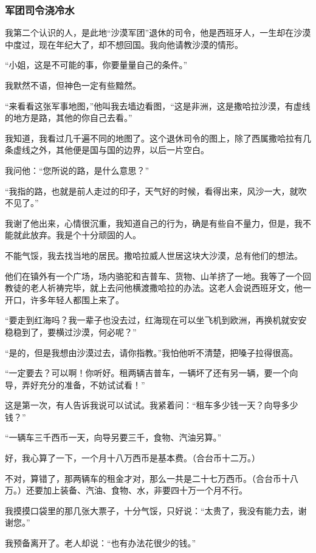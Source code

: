 \subsubsection*{军团司令浇冷水}
\par 我第二个认识的人，是此地“沙漠军团”退休的司令，他是西班牙人，一生却在沙漠中度过，现在年纪大了，却不想回国。我向他请教沙漠的情形。
\par “小姐，这是不可能的事，你要量量自己的条件。”
\par 我默然不语，但神色一定有些黯然。
\par “来看看这张军事地图，”他叫我去墙边看图，“这是非洲，这是撒哈拉沙漠，有虚线的地方是路，其他的你自己去看。”
\par 我知道，我看过几千遍不同的地图了。这个退休司令的图上，除了西属撒哈拉有几条虚线之外，其他便是国与国的边界，以后一片空白。
\par 我问他：“您所说的路，是什么意思？”
\par “我指的路，也就是前人走过的印子，天气好的时候，看得出来，风沙一大，就吹不见了。”
\par 我谢了他出来，心情很沉重，我知道自己的行为，确是有些自不量力，但是，我不能就此放弃。我是个十分顽固的人。
\par 不能气馁，我去找当地的居民。撒哈拉威人世居这块大沙漠，总有他们的想法。
\par 他们在镇外有一个广场，场内骆驼和吉普车、货物、山羊挤了一地。我等了一个回教徒的老人祈祷完毕，就上去问他横渡撒哈拉的办法。这老人会说西班牙文，他一开口，许多年轻人都围上来了。
\par “要走到红海吗？我一辈子也没去过，红海现在可以坐飞机到欧洲，再换机就安安稳稳到了，要横过沙漠，何必呢？”
\par “是的，但是我想由沙漠过去，请你指教。”我怕他听不清楚，把嗓子拉得很高。
\par “一定要去？可以啊！你听好。租两辆吉普车，一辆坏了还有另一辆，要一个向导，弄好充分的准备，不妨试试看！”
\par 这是第一次，有人告诉我说可以试试。我紧着问：“租车多少钱一天？向导多少钱？”
\par “一辆车三千西币一天，向导另要三千，食物、汽油另算。”
\par 好，我心算了一下，一个月十八万西币是基本费。（合台币十二万。）
\par 不对，算错了，那两辆车的租金才对，那么一共是二十七万西币。（合台币十八万。）还要加上装备、汽油、食物、水，非要四十万一个月不行。
\par 我摸摸口袋里的那几张大票子，十分气馁，只好说：“太贵了，我没有能力去，谢谢您。”
\par 我预备离开了。老人却说：“也有办法花很少的钱。”
